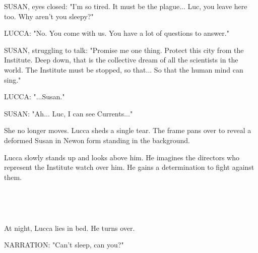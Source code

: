 \documentclass[11pt]{article}
\begin{document}
SUSAN, eyes closed: "I'm so tired.
It must be the plague...
Luc, you leave here too.
Why aren't you sleepy?"

LUCCA: "No. You come with us. 
You have a lot of questions to answer."

SUSAN, struggling to talk: "Promise me one thing.
Protect this city from the Institute.
Deep down, that is the collective dream of all the scientists in the world.
The Institute must be stopped, so that...
So that the human mind can sing."

LUCCA: "...Susan."

SUSAN: "Ah... Luc, I can see Currents..."

She no longer moves.
Lucca sheds a single tear.
The frame pans over to reveal a deformed Susan in Newon form standing in the background.

Lucca slowly stands up and looks above him.
He imagines the directors who represent the Institute watch over him.
He gains a determination to fight against them. 

\ 

\ 

At night, Lucca lies in bed.
He turns over.

NARRATION: "Can't sleep, can you?"
\end{document}
